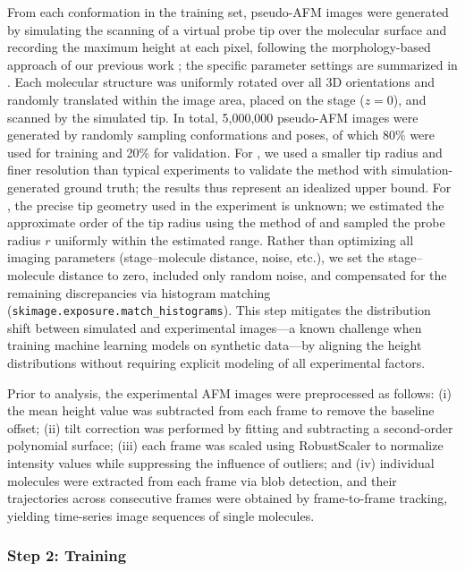 From each conformation in the training set, pseudo-AFM images were generated by simulating the scanning of a virtual probe tip over the molecular surface and recording the maximum height at each pixel, following the morphology-based approach of our previous work \cite{matsunaga2023endtoend}; the specific parameter settings are summarized in .
Each molecular structure was uniformly rotated over all 3D orientations and randomly translated within the image area, placed on the stage ($z=0$), and scanned by the simulated tip.
In total, 5{,}000{,}000 pseudo-AFM images were generated by randomly sampling conformations and poses, of which 80\% were used for training and 20\% for validation.
For \AK, we used a smaller tip radius and finer resolution than typical experiments to validate the method with simulation-generated ground truth; the results thus represent an idealized upper bound.
For \flhac, the precise tip geometry used in the experiment is unknown; we estimated the approximate order of the tip radius using the method of \cite{matsunaga2023endtoend} and sampled the probe radius $r$ uniformly within the estimated range.
Rather than optimizing all imaging parameters (stage--molecule distance, noise, etc.), we set the stage--molecule distance to zero, included only random noise, and compensated for the remaining discrepancies via histogram matching (\verb|skimage.exposure.match_histograms|).
This step mitigates the distribution shift between simulated and experimental images---a known challenge when training machine learning models on synthetic data---by aligning the height distributions without requiring explicit modeling of all experimental factors.

Prior to analysis, the experimental AFM images were preprocessed as follows:
(i) the mean height value was subtracted from each frame to remove the baseline offset;
(ii) tilt correction was performed by fitting and subtracting a second-order polynomial surface;
(iii) each frame was scaled using RobustScaler to normalize intensity values while suppressing the influence of outliers; and
(iv) individual molecules were extracted from each frame via blob detection, and their trajectories across consecutive frames were obtained by frame-to-frame tracking, yielding time-series image sequences of single molecules.

\subsubsection{Step 2: Training}
\label{subsubsec:training}

